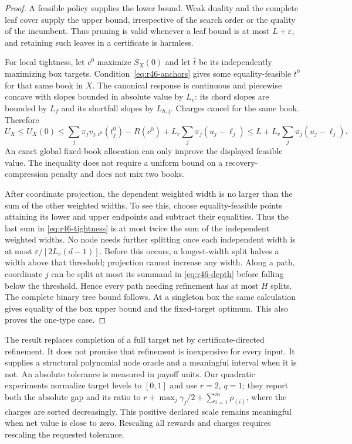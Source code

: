 \begin{proof}
A feasible policy supplies the lower bound. Weak duality and the complete leaf cover supply the upper bound, irrespective of the search order or the quality of the incumbent. Thus pruning is valid whenever a leaf bound is at most $L+\varepsilon$, and retaining such leaves in a certificate is harmless.

For local tightness, let $c^0$ maximize $S_X(0)$ and let $\hat t$ be its independently maximizing box targets. Condition~\eqref{eq:r46-anchors} gives some equality-feasible $t^0$ for that same book in $X$. The canonical response is continuous and piecewise concave with slopes bounded in absolute value by $L_v$: its chord slopes are bounded by $L_f$ and its shortfall slopes by $L_{h,j}$. Charges cancel for the same book. Therefore
\begin{equation}\label{eq:r46-tightness}
 U_X\leq U_X(0)\leq
 \sum_j\pi_jv_{j,c^0}(t_j^0)-R(c^0)
       +L_v\sum_j\pi_j(u_j-\ell_j)
 \leq L+L_v\sum_j\pi_j(u_j-\ell_j).
\end{equation}
An exact global fixed-book allocation can only improve the displayed feasible value. The inequality does not require a uniform bound on a recovery-compression penalty and does not mix two books.

After coordinate projection, the dependent weighted width is no larger than the sum of the other weighted widths. To see this, choose equality-feasible points attaining its lower and upper endpoints and subtract their equalities. Thus the last sum in \eqref{eq:r46-tightness} is at most twice the sum of the independent weighted widths. No node needs further splitting once each independent width is at most $\varepsilon/[2L_v(d-1)]$. Before this occurs, a longest-width split halves a width above that threshold; projection cannot increase any width. Along a path, coordinate $j$ can be split at most its summand in \eqref{eq:r46-depth} before falling below the threshold. Hence every path needing refinement has at most $H$ splits. The complete binary tree bound follows. At a singleton box the same calculation gives equality of the box upper bound and the fixed-target optimum. This also proves the one-type case.
\end{proof}
The result replaces completion of a full target net by certificate-directed refinement. It does not promise that refinement is inexpensive for every input. It supplies a structural polynomial node oracle and a meaningful interval when it is not. An absolute tolerance is measured in payoff units. Our quadratic experiments normalize target levels to $[0,1]$ and use $r=2$, $q=1$; they report both the absolute gap and its ratio to $r+\max_j\gamma_j/2+\sum_{i=1}^m\rho_{(i)}$, where the charges are sorted decreasingly. This positive declared scale remains meaningful when net value is close to zero. Rescaling all rewards and charges requires rescaling the requested tolerance.

